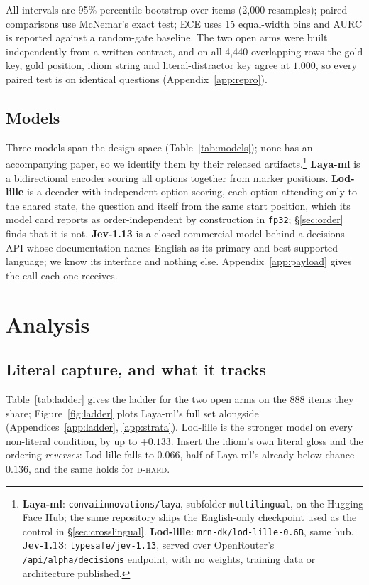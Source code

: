 \documentclass[11pt]{article}
\newcommand{\Dhard}{\textsc{d-hard}}
\begin{document}
All intervals are 95\% percentile bootstrap over items (2{,}000 resamples);
paired comparisons use McNemar's exact test; ECE uses 15 equal-width bins and
AURC is reported against a random-gate baseline. The two open arms were built
independently from a written contract, and on all 4{,}440 overlapping rows the
gold key, gold position, idiom string and literal-distractor key agree at
$1.000$, so every paired test is on identical questions
(Appendix~\ref{app:repro}).

\subsection{Models}

Three models span the design space (Table~\ref{tab:models}); none has an
accompanying paper, so we identify them by their released
artifacts.\footnote{\textbf{Laya-ml}: \texttt{convaiinnovations/laya}, subfolder
\texttt{multilingual}, on the Hugging Face Hub; the same repository ships the
English-only checkpoint used as the control in \S\ref{sec:crosslingual}.
\textbf{Lod-lille}: \texttt{mrn-dk/lod-lille-0.6B}, same hub.
\textbf{Jev-1.13}: \texttt{typesafe/jev-1.13}, served over OpenRouter's
\texttt{/api/alpha/decisions} endpoint, with no weights, training data or
architecture published.}
\textbf{Laya-ml} is a bidirectional encoder scoring all options together from
marker positions. \textbf{Lod-lille} is a decoder with independent-option
scoring, each option attending only to the shared state, the question and itself
from the same start position, which its model card reports as order-independent
by construction in \texttt{fp32}; \S\ref{sec:order} finds that it is not.
\textbf{Jev-1.13} is a closed commercial model behind a decisions API whose
documentation names English as its primary and best-supported language; we know
its interface and nothing else. Appendix~\ref{app:payload} gives the call each one
receives.

\section{Analysis}
\label{sec:analysis}

\subsection{Literal capture, and what it tracks}
\label{sec:capture}

Table~\ref{tab:ladder} gives the ladder for the two open arms on the 888 items
they share; Figure~\ref{fig:ladder} plots Laya-ml's full set alongside
(Appendices~\ref{app:ladder}, \ref{app:strata}). Lod-lille is the stronger
model on every non-literal condition, by up to $+0.133$. Insert the idiom's own
literal gloss and the ordering \emph{reverses}: Lod-lille falls to $0.066$, half
of Laya-ml's already-below-chance $0.136$, and the same holds for \Dhard.
\end{document}
